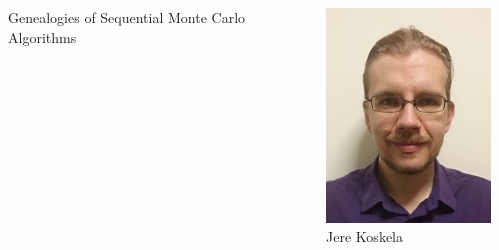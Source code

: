 \documentclass[aspectratio=169]{beamer}
\title{}
\author{{\LARGE Suzie Brown}}
\date{2 November 2018}
\begin{document}
\begin{frame}
\maketitle
\end{frame}

\begin{frame}
\begin{columns}
\begin{column}{0.4\textwidth}
{\LARGE Genealogies of Sequential Monte Carlo Algorithms}
\end{column}
\begin{column}{0.2\textwidth}
\centering
\includegraphics[width=\textwidth]{jere.jpg}\\
Jere Koskela
\end{column}
\begin{column}{0.2\textwidth}
\centering

\end{column}
\end{columns}
\end{frame}
\end{document}
